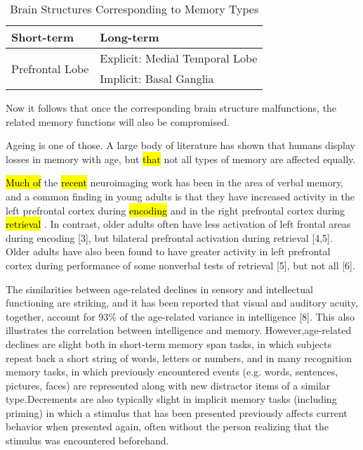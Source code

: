 \documentclass{article}
\begin{document}
\begin{table}[h]
\centering
\begin{tabular}{@{}ll@{}}
    \toprule
    Short-term      & Long-term \\
    \midrule
    \multirow{2}{*}{Prefrontal Lobe \tablefootnote{\cite{fusterCrossmodalCrosstemporalAssociation2000}}} & Explicit: Medial Temporal Lobe \tablefootnote{\cite{squireMedialTemporalLobe1991}}\\
                                                     & Implicit: Basal Ganglia \tablefootnote{\cite{foerdeRoleBasalGanglia2011}}\\
    \bottomrule
\end{tabular}
\caption{Brain Structures Corresponding to Memory Types}
\label{BrainStructMemoryTypes}
\end{table}

Now it follows that once the corresponding brain structure malfunctions, the related memory functions will also be compromised. 




Ageing is one of those. A large body of literature has shown that humans display losses in memory with age, but \hl{that} not all types of memory are affected equally. 

\hl{Much of}  the \hl{recent}  neuroimaging work has been in the area of verbal memory, and a common finding in young adults is that they have increased activity in the left prefrontal cortex during \hl{encoding}  and in the right prefrontal cortex during \hl{retrieval} . In contrast, older adults often have less activation of left frontal areas during encoding [3], but bilateral prefrontal activation during retrieval [4,5]. Older adults have also been found to have greater activity in left prefrontal cortex during performance of some nonverbal tests of retrieval [5], but not all [6].

The similarities between age-related declines in sensory and intellectual functioning are striking, and it has been reported that visual and auditory acuity, together, account for 93\% of the age-related variance in intelligence [8]. This also illustrates the correlation between intelligence and memory. However,age-related declines are  slight both in short-term memory span tasks, in which subjects repeat back a short string of words, letters or  numbers, and in many recognition memory tasks, in which  previously encountered events (e.g. words, sentences, pictures, faces) are represented along with new distractor items of a similar type.Decrements are also typically slight in implicit memory tasks (including priming) in which a stimulus that has been presented previously affects current behavior when presented again, often without the person realizing that the stimulus was encountered beforehand. 
\end{document}
